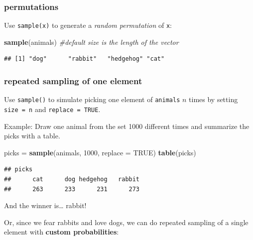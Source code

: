 \documentclass[
]{book}
\newenvironment{Shaded}{\begin{snugshade}}{\end{snugshade}}
\newcommand{\AttributeTok}[1]{\textcolor[rgb]{0.13,0.29,0.53}{#1}}
\newcommand{\CommentTok}[1]{\textcolor[rgb]{0.56,0.35,0.01}{\textit{#1}}}
\newcommand{\ConstantTok}[1]{\textcolor[rgb]{0.56,0.35,0.01}{#1}}
\newcommand{\DecValTok}[1]{\textcolor[rgb]{0.00,0.00,0.81}{#1}}
\newcommand{\FunctionTok}[1]{\textcolor[rgb]{0.13,0.29,0.53}{\textbf{#1}}}
\newcommand{\NormalTok}[1]{#1}
\newcommand{\OtherTok}[1]{\textcolor[rgb]{0.56,0.35,0.01}{#1}}
\theoremstyle{definition}
\theoremstyle{definition}
\theoremstyle{definition}
\theoremstyle{definition}
\theoremstyle{remark}
\begin{document}
\subsubsection*{permutations}\label{permutations-1}

Use \texttt{sample(x)} to generate a \emph{random permutation} of \texttt{x}:

\begin{Shaded}
\begin{Highlighting}[]
\FunctionTok{sample}\NormalTok{(animals) }\CommentTok{\#default size is the length of the vector}
\end{Highlighting}
\end{Shaded}

\begin{verbatim}
## [1] "dog"      "rabbit"   "hedgehog" "cat"
\end{verbatim}

\subsubsection*{repeated sampling of one element}\label{repeated-sampling-of-one-element}

Use \texttt{sample()} to simulate picking one element of \texttt{animals} \(n\) times by setting \texttt{size\ =\ n} and \texttt{replace\ =\ TRUE}.

Example: Draw one animal from the set 1000 different times and summarize the picks with a table.

\begin{Shaded}
\begin{Highlighting}[]
\NormalTok{picks }\OtherTok{=} \FunctionTok{sample}\NormalTok{(animals, }\DecValTok{1000}\NormalTok{, }\AttributeTok{replace =} \ConstantTok{TRUE}\NormalTok{) }
\FunctionTok{table}\NormalTok{(picks) }
\end{Highlighting}
\end{Shaded}

\begin{verbatim}
## picks
##      cat      dog hedgehog   rabbit 
##      263      233      231      273
\end{verbatim}

And the winner is\ldots{} rabbit!

Or, since we fear rabbits and love dogs, we can do repeated sampling of a single element with \textbf{custom probabilities}:
\end{document}
